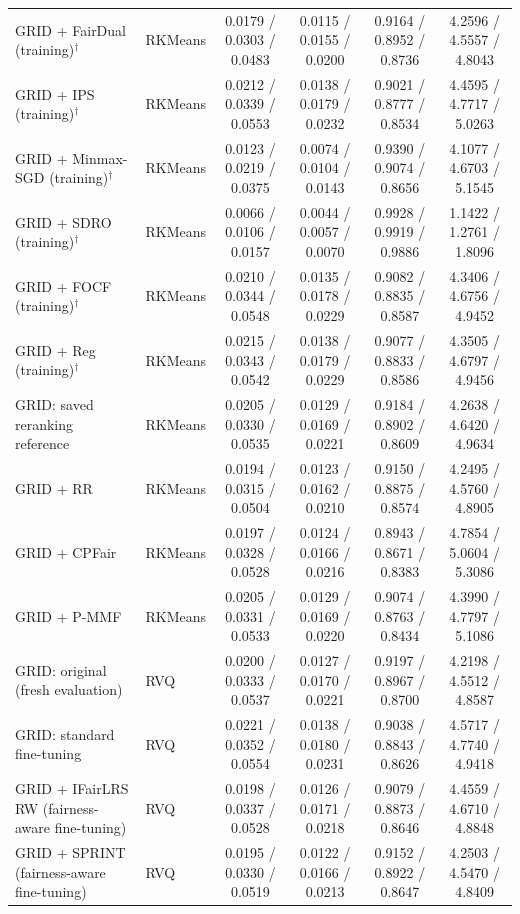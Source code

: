 \begin{table}[p]
{\begin{tabular}{llcccc}
GRID + FairDual (training)$^{\dagger}$ & RKMeans & 0.0179 / 0.0303 / 0.0483 & 0.0115 / 0.0155 / 0.0200 & 0.9164 / 0.8952 / 0.8736 & 4.2596 / 4.5557 / 4.8043 \\
GRID + IPS (training)$^{\dagger}$ & RKMeans & 0.0212 / 0.0339 / 0.0553 & 0.0138 / 0.0179 / 0.0232 & 0.9021 / 0.8777 / 0.8534 & 4.4595 / 4.7717 / 5.0263 \\
GRID + Minmax-SGD (training)$^{\dagger}$ & RKMeans & 0.0123 / 0.0219 / 0.0375 & 0.0074 / 0.0104 / 0.0143 & 0.9390 / 0.9074 / 0.8656 & 4.1077 / 4.6703 / 5.1545 \\
GRID + SDRO (training)$^{\dagger}$ & RKMeans & 0.0066 / 0.0106 / 0.0157 & 0.0044 / 0.0057 / 0.0070 & 0.9928 / 0.9919 / 0.9886 & 1.1422 / 1.2761 / 1.8096 \\
GRID + FOCF (training)$^{\dagger}$ & RKMeans & 0.0210 / 0.0344 / 0.0548 & 0.0135 / 0.0178 / 0.0229 & 0.9082 / 0.8835 / 0.8587 & 4.3406 / 4.6756 / 4.9452 \\
GRID + Reg (training)$^{\dagger}$ & RKMeans & 0.0215 / 0.0343 / 0.0542 & 0.0138 / 0.0179 / 0.0229 & 0.9077 / 0.8833 / 0.8586 & 4.3505 / 4.6797 / 4.9456 \\
GRID: saved reranking reference & RKMeans & 0.0205 / 0.0330 / 0.0535 & 0.0129 / 0.0169 / 0.0221 & 0.9184 / 0.8902 / 0.8609 & 4.2638 / 4.6420 / 4.9634 \\
GRID + RR & RKMeans & 0.0194 / 0.0315 / 0.0504 & 0.0123 / 0.0162 / 0.0210 & 0.9150 / 0.8875 / 0.8574 & 4.2495 / 4.5760 / 4.8905 \\
GRID + CPFair & RKMeans & 0.0197 / 0.0328 / 0.0528 & 0.0124 / 0.0166 / 0.0216 & 0.8943 / 0.8671 / 0.8383 & 4.7854 / 5.0604 / 5.3086 \\
GRID + P-MMF & RKMeans & 0.0205 / 0.0331 / 0.0533 & 0.0129 / 0.0169 / 0.0220 & 0.9074 / 0.8763 / 0.8434 & 4.3990 / 4.7797 / 5.1086 \\
\midrule
GRID: original (fresh evaluation) & RVQ & 0.0200 / 0.0333 / 0.0537 & 0.0127 / 0.0170 / 0.0221 & 0.9197 / 0.8967 / 0.8700 & 4.2198 / 4.5512 / 4.8587 \\
GRID: standard fine-tuning & RVQ & 0.0221 / 0.0352 / 0.0554 & 0.0138 / 0.0180 / 0.0231 & 0.9038 / 0.8843 / 0.8626 & 4.5717 / 4.7740 / 4.9418 \\
GRID + IFairLRS RW (fairness-aware fine-tuning) & RVQ & 0.0198 / 0.0337 / 0.0528 & 0.0126 / 0.0171 / 0.0218 & 0.9079 / 0.8873 / 0.8646 & 4.4559 / 4.6710 / 4.8848 \\
GRID + SPRINT (fairness-aware fine-tuning) & RVQ & 0.0195 / 0.0330 / 0.0519 & 0.0122 / 0.0166 / 0.0213 & 0.9152 / 0.8922 / 0.8647 & 4.2503 / 4.5470 / 4.8409 \\

\end{tabular}}
\end{table}
